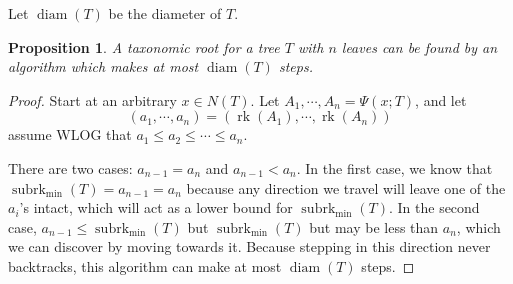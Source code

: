 \documentclass{amsart}
\newcommand{\treecut}{\Psi}
\newcommand{\rk}{\operatorname{rk}}
\newcommand{\subrk}{\operatorname{subrk}}
\newcommand{\minsubrk}{\subrk_{\min}}
\newcommand{\diam}{\operatorname{diam}}
\newtheorem{prop}{Proposition}
\begin{document}
Let $\diam(T)$ be the diameter of $T$.

\begin{prop}
A taxonomic root for a tree $T$ with $n$ leaves can be found by an algorithm which makes at most $\diam(T)$ steps.
\end{prop}

\begin{proof}
  Start at an arbitrary $x \in N(T)$.
  Let ${A_1,\cdots,A_n} = \treecut(x;T)$, and let
  \[
    (a_1,\cdots,a_n) = (\rk(A_1), \cdots, \rk(A_n))
  \]
  assume WLOG that $a_1 \leq a_2 \leq \cdots \leq a_n$.

  There are two cases: $a_{n-1} = a_n$ and $a_{n-1} < a_n$.
  In the first case, we know that $\minsubrk(T) = a_{n-1} = a_n$ because any direction we travel will leave one of the $a_i$'s intact, which will act as a lower bound for $\minsubrk(T)$.
  In the second case, $a_{n-1} \leq \minsubrk(T)$ but $\minsubrk(T)$ but may be less than $a_n$, which we can discover by moving towards it.
  Because stepping in this direction never backtracks, this algorithm can make at most $\diam(T)$ steps.
\end{proof}
\end{document}
